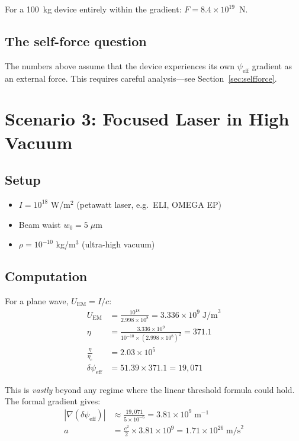 \documentclass[12pt,a4paper]{article}
\newcommand{\psieff}{\psi_{\mathrm{eff}}}
\newcommand{\etac}{\eta_{\mathrm{c}}}
\begin{document}
For a 100~kg device entirely within the gradient: $F = 8.4 \times 10^{19}$~N.

\subsection{The self-force question}
\label{sec:selfforce_scenario2}

The numbers above assume that the device experiences its own $\psieff$ gradient as an external force.
This requires careful analysis---see Section~\ref{sec:selfforce}.

\section{Scenario 3: Focused Laser in High Vacuum}
\label{sec:scenario3}

\subsection{Setup}

\begin{itemize}
\item $I = 10^{18}$ W/m$^2$ (petawatt laser, e.g.\ ELI, OMEGA EP)
\item Beam waist $w_0 = 5\;\mu$m
\item $\rho = 10^{-10}$ kg/m$^3$ (ultra-high vacuum)
\end{itemize}

\subsection{Computation}

For a plane wave, $U_{\mathrm{EM}} = I/c$:
\begin{align}
U_{\mathrm{EM}} &= \frac{10^{18}}{2.998 \times 10^8} = 3.336 \times 10^9 \;\text{J/m}^3 \\[6pt]
\eta &= \frac{3.336 \times 10^9}{10^{-10} \times (2.998 \times 10^8)^2} = 371.1 \\[6pt]
\frac{\eta}{\etac} &= 2.03 \times 10^5 \\[6pt]
\delta\psieff &= 51.39 \times 371.1 = 19{,}071
\end{align}

This is \emph{vastly} beyond any regime where the linear threshold formula could hold.
The formal gradient gives:
\begin{align}
|\nabla(\delta\psieff)| &\approx \frac{19{,}071}{5 \times 10^{-6}} = 3.81 \times 10^9 \;\text{m}^{-1} \\[6pt]
a &= \frac{c^2}{2} \times 3.81 \times 10^9 = 1.71 \times 10^{26} \;\text{m/s}^2
\end{align}
\end{document}
